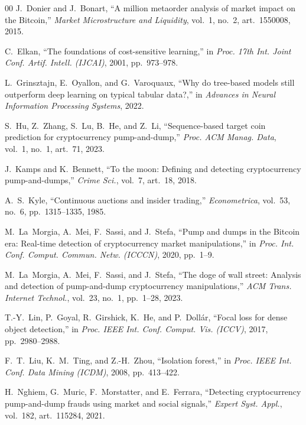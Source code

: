 \documentclass{ieeeaccess}
\begin{document}
\begin{thebibliography}{00}
 J.~Donier and J.~Bonart, ``A million metaorder analysis of market impact on the Bitcoin,'' \emph{Market Microstructure and Liquidity}, vol.~1, no.~2, art.~1550008, 2015.

 C.~Elkan, ``The foundations of cost-sensitive learning,'' in \emph{Proc. 17th Int. Joint Conf. Artif. Intell. (IJCAI)}, 2001, pp.~973--978.

 L.~Grinsztajn, E.~Oyallon, and G.~Varoquaux, ``Why do tree-based models still outperform deep learning on typical tabular data?,'' in \emph{Advances in Neural Information Processing Systems}, 2022.

 S.~Hu, Z.~Zhang, S.~Lu, B.~He, and Z.~Li, ``Sequence-based target coin prediction for cryptocurrency pump-and-dump,'' \emph{Proc. ACM Manag. Data}, vol.~1, no.~1, art.~71, 2023.

 J.~Kamps and K.~Bennett, ``To the moon: Defining and detecting cryptocurrency pump-and-dumps,'' \emph{Crime Sci.}, vol.~7, art.~18, 2018.

 A.~S.~Kyle, ``Continuous auctions and insider trading,'' \emph{Econometrica}, vol.~53, no.~6, pp.~1315--1335, 1985.

 M.~La~Morgia, A.~Mei, F.~Sassi, and J.~Stefa, ``Pump and dumps in the Bitcoin era: Real-time detection of cryptocurrency market manipulations,'' in \emph{Proc. Int. Conf. Comput. Commun. Netw. (ICCCN)}, 2020, pp.~1--9.

 M.~La~Morgia, A.~Mei, F.~Sassi, and J.~Stefa, ``The doge of wall street: Analysis and detection of pump-and-dump cryptocurrency manipulations,'' \emph{ACM Trans. Internet Technol.}, vol.~23, no.~1, pp.~1--28, 2023.

 T.-Y.~Lin, P.~Goyal, R.~Girshick, K.~He, and P.~Doll\'{a}r, ``Focal loss for dense object detection,'' in \emph{Proc. IEEE Int. Conf. Comput. Vis. (ICCV)}, 2017, pp.~2980--2988.

 F.~T.~Liu, K.~M.~Ting, and Z.-H.~Zhou, ``Isolation forest,'' in \emph{Proc. IEEE Int. Conf. Data Mining (ICDM)}, 2008, pp.~413--422.

 H.~Nghiem, G.~Muric, F.~Morstatter, and E.~Ferrara, ``Detecting cryptocurrency pump-and-dump frauds using market and social signals,'' \emph{Expert Syst. Appl.}, vol.~182, art.~115284, 2021.


\end{thebibliography}
\end{document}
